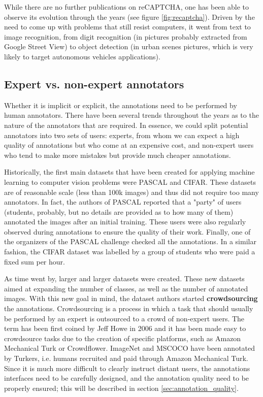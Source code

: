 While there are no further publications on reCAPTCHA, one has been able to observe its evolution through the years (see figure \ref{fig:recaptcha}). Driven by the need to come up with problems that still resist computers, it went from text to image recognition, from digit recognition (in pictures probably extracted from Google Street View) to object detection (in urban scenes pictures, which is very likely to target autonomous vehicles applications).


\subsection{Expert vs. non-expert annotators}

Whether it is implicit or explicit, the annotations need to be performed by human annotators. There have been several trends throughout the years as to the nature of the annotators that are required. In essence, we could split potential annotators into two sets of users: experts, from whom we can expect a high quality of annotations but who come at an expensive cost, and non-expert users who tend to make more mistakes but provide much cheaper annotations. 

Historically, the first main datasets that have been created for applying machine learning to computer vision problems were PASCAL and CIFAR. These datasets are of reasonable scale (less than 100k images) and thus did not require too many annotators. In fact, the authors of PASCAL \cite{Everingham10} reported that a "party" of users (students, probably, but no details are provided as to how many of them) annotated the images after an initial training. These users were also regularly observed during annotations to ensure the quality of their work. Finally, one of the organizers of the PASCAL challenge checked all the annotations. In a similar fashion, the CIFAR dataset \cite{krizhevsky2009learning} was labelled by a group of students who were paid a fixed sum per hour.

As time went by, larger and larger datasets were created. These new datasets aimed at expanding the number of classes, as well as the number of annotated images. With this new goal in mind, the dataset authors started \textbf{crowdsourcing} the annotations. Crowdsourcing is a process in which a task that should usually be performed by an expert is outsourced to a crowd of non-expert users. The term has been first coined by Jeff Howe in 2006 \cite{howe2006rise} and it has been made easy to crowdsource tasks due to the creation of specific platforms, such as Amazon Mechanical Turk or Crowdflower. ImageNet and MSCOCO have been annotated by Turkers, i.e. humans recruited and paid through Amazon Mechanical Turk. Since it is much more difficult to clearly instruct distant users, the annotations interfaces need to be carefully designed, and the annotation quality need to be properly ensured; this will be described in section \ref{sec:annotation_quality}.  	 

